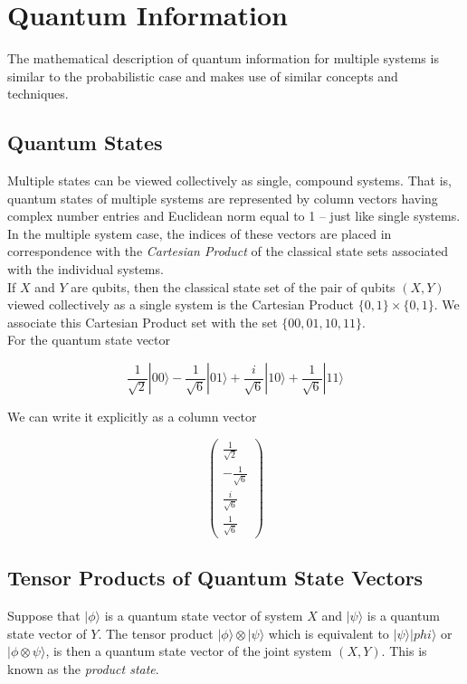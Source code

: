 \documentclass[svgnames]{article}     %
\begin{document}
\section{Quantum Information}

The mathematical description of quantum information for multiple systems is similar to the probabilistic case and makes use of similar concepts and techniques. 

\subsection{Quantum States}

Multiple states can be viewed collectively as single, compound systems. That is, quantum states of multiple systems are represented by column vectors having complex number entries and Euclidean norm equal to 1 -- just like single systems. In the multiple system case, the indices of these vectors are placed in correspondence with the \textit{Cartesian Product} of the classical state sets associated with the individual systems. \\

If $X$ and $Y$ are qubits, then the classical state set of the pair of qubits
$(X,Y)$ viewed collectively as a single system is the Cartesian Product $\{0,
1\} \times \{0, 1\}$. We associate this Cartesian Product set with the set
$\{00, 01, 10, 11\}$. \\

For the quantum state vector 

\[
  \frac{1}{\sqrt{2}}|00\rangle - \frac{1}{\sqrt{6}}|01\rangle + \frac{i}{\sqrt{6}}|10\rangle  + \frac{1}{\sqrt{6}}|11\rangle 
\] \vspace{5px}

We can write it explicitly as a column vector

\[
\begin{pmatrix}
  \frac{1}{\sqrt{2}}\\[4px] -\frac{1}{\sqrt{6}} \\[4px] \frac{i}{\sqrt{6}} \\[4px] \frac{1}{\sqrt{6}}

\end{pmatrix}
\] \vspace{5px}
\subsection{Tensor Products of Quantum State Vectors}

Suppose that  $|\phi\rangle $ is a quantum state vector of system $X$ and $|\psi\rangle $ is a quantum state vector of $Y$. The tensor product $|\phi\rangle \otimes |\psi\rangle $ which is equivalent to $|\psi\rangle |phi\rangle $ or $|\phi\otimes\psi\rangle $, is then a quantum state vector of the joint system $(X, Y)$. This is known as the \textit{product state}. \\
\end{document}
